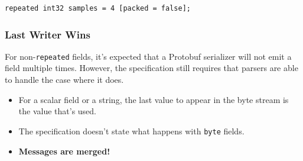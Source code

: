 \begin{verbatim}
repeated int32 samples = 4 [packed = false];
\end{verbatim}

\subsubsection{Last Writer Wins}\label{sec:last-writer-wins}

For non-\texttt{repeated} fields, it's expected that a Protobuf serializer will
not emit a field multiple times. However, the specification still requires that
parsers are able to handle the case where it does.

\begin{itemize}
\item For a scalar field or a string, the last value to appear in the byte
  stream is the value that's used.
\item The specification doesn't state what happens with \texttt{byte} fields.
\item \textbf{Messages are merged!}
\end{itemize}

